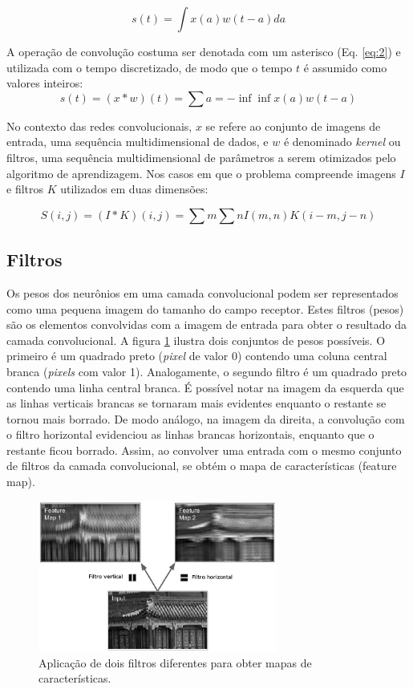 \begin{equation}
 s(t) = \int{x(a) w(t-a)da}
 \label{eq:1}
\end{equation}

A operação de convolução costuma ser denotada com um asterisco (Eq. \ref{eq:2}) e utilizada com o tempo
discretizado, de modo que o tempo $t$ é assumido como valores inteiros:
\begin{equation}
 s(t) = (x * w)(t) = \sum{a=-\inf}{\inf}{x(a)w(t-a)}
 \label{eq:2}
\end{equation}

No contexto das redes convolucionais, $x$ se refere ao conjunto de imagens de entrada, uma sequência multidimensional
de dados, e $w$ é denominado \textit{kernel} ou filtros, uma sequência multidimensional de parâmetros 
a serem otimizados pelo algoritmo de aprendizagem.
Nos casos em que o problema compreende imagens $I$ e filtros $K$ utilizados em duas dimensões:

\begin{equation}
 S(i,j) = (I*K)(i,j) = \sum{m}\sum{n}{I(m,n)K(i-m,j-n)}
\end{equation}

\subsection{Filtros}
Os pesos dos neurônios em uma camada convolucional podem ser representados como uma pequena
imagem do tamanho do campo receptor. Estes filtros (pesos) são os elementos
convolvidas com a imagem de entrada para obter o resultado da camada convolucional.
A figura \ref{fig:conv_filt} ilustra dois conjuntos de pesos possíveis. O primeiro é um quadrado preto
(\textit{pixel} de valor 0) contendo uma coluna central branca (\textit{pixels} com valor 1). 
Analogamente, o segundo filtro é um quadrado preto contendo uma linha central branca.
É possível notar na imagem da esquerda que as linhas verticais brancas se tornaram mais evidentes enquanto o restante
se tornou mais borrado. De modo análogo, na imagem da direita, a convolução com o filtro horizontal evidenciou as linhas brancas horizontais, enquanto que
o restante ficou borrado. Assim, ao convolver uma entrada com o mesmo conjunto de filtros da camada convolucional, se obtém
o mapa de características (feature map).
\begin{figure}[htp]
\begin{center}
  \includegraphics[width=0.7\textwidth]{fig/conv_filt}
  \caption{Aplicação de dois filtros diferentes para obter mapas de características.}
  \label{fig:conv_filt}
\end{center}
\end{figure}

